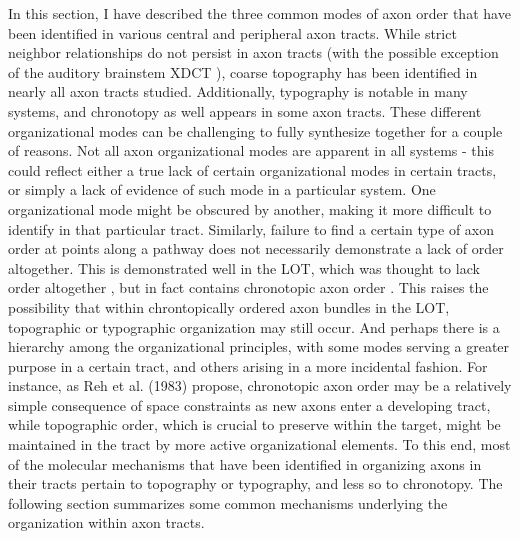 In this section, I have described the three common modes of axon order that have been identified in various central and peripheral axon tracts.
While strict neighbor relationships do not persist in axon tracts (with the possible exception of the auditory brainstem XDCT \cite{kashima2013pre}), coarse topography has been identified in nearly all axon tracts studied.
Additionally, typography is notable in many systems, and chronotopy as well appears in some axon tracts.
These different organizational modes can be challenging to fully synthesize together for a couple of reasons.
Not all axon organizational modes are apparent in all systems - this could reflect either a true lack of certain organizational modes in certain tracts, or simply a lack of evidence of such mode in a particular system.
One organizational mode might be obscured by another, making it more difficult to identify in that particular tract.
Similarly, failure to find a certain type of axon order at points along a pathway does not necessarily demonstrate a lack of order altogether.
This is demonstrated well in the LOT, which was thought to lack order altogether \cite{price1975observation}, but in fact contains chronotopic axon order \cite{yamatani2004chronotopic}.
This raises the possibility that within chrontopically ordered axon bundles in the LOT, topographic or typographic organization may still occur.
And perhaps there is a hierarchy among the organizational principles, with some modes serving a greater purpose in a certain tract, and others arising in a more incidental fashion.
For instance, as Reh et al. (1983) propose, chronotopic axon order may be a relatively simple consequence of space constraints as new axons enter a developing tract, while topographic order, which is crucial to preserve within the target, might be maintained in the tract by more active organizational elements.
To this end, most of the molecular mechanisms that have been identified in organizing axons in their tracts pertain to topography or typography, and less so to chronotopy.
The following section summarizes some common mechanisms underlying the organization within axon tracts.